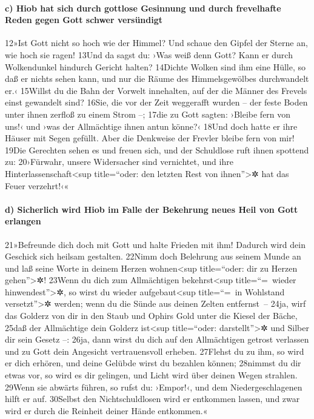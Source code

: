 \hypertarget{c-hiob-hat-sich-durch-gottlose-gesinnung-und-durch-frevelhafte-reden-gegen-gott-schwer-versuxfcndigt}{%
\paragraph{c) Hiob hat sich durch gottlose Gesinnung und durch
frevelhafte Reden gegen Gott schwer
versündigt}\label{c-hiob-hat-sich-durch-gottlose-gesinnung-und-durch-frevelhafte-reden-gegen-gott-schwer-versuxfcndigt}}

12»Ist Gott nicht so hoch wie der Himmel? Und schaue den Gipfel der
Sterne an, wie hoch sie ragen! 13Und da sagst du: ›Was weiß denn Gott?
Kann er durch Wolkendunkel hindurch Gericht halten? 14Dichte Wolken sind
ihm eine Hülle, so daß er nichts sehen kann, und nur die Räume des
Himmelsgewölbes durchwandelt er.‹ 15Willst du die Bahn der Vorwelt
innehalten, auf der die Männer des Frevels einst gewandelt sind? 16Sie,
die vor der Zeit weggerafft wurden -- der feste Boden unter ihnen
zerfloß zu einem Strom --; 17die zu Gott sagten: ›Bleibe fern von uns!‹
und ›was der Allmächtige ihnen antun könne?‹ 18Und doch hatte er ihre
Häuser mit Segen gefüllt. Aber die Denkweise der Frevler bleibe fern von
mir! 19Die Gerechten sehen es und freuen sich, und der Schuldlose ruft
ihnen spottend zu: 20›Fürwahr, unsere Widersacher sind vernichtet, und
ihre Hinterlassenschaft\textless sup title=``oder: den letzten Rest von
ihnen''\textgreater✲ hat das Feuer verzehrt!‹«

\hypertarget{d-sicherlich-wird-hiob-im-falle-der-bekehrung-neues-heil-von-gott-erlangen}{%
\paragraph{d) Sicherlich wird Hiob im Falle der Bekehrung neues Heil von
Gott
erlangen}\label{d-sicherlich-wird-hiob-im-falle-der-bekehrung-neues-heil-von-gott-erlangen}}

21»Befreunde dich doch mit Gott und halte Frieden mit ihm! Dadurch wird
dein Geschick sich heilsam gestalten. 22Nimm doch Belehrung aus seinem
Munde an und laß seine Worte in deinem Herzen wohnen\textless sup
title=``oder: dir zu Herzen gehen''\textgreater✲! 23Wenn du dich zum
Allmächtigen bekehrst\textless sup title=``=~wieder
hinwendest''\textgreater✲, so wirst du wieder aufgebaut\textless sup
title=``=~in Wohlstand versetzt''\textgreater✲ werden; wenn du die Sünde
aus deinen Zelten entfernst~-- 24ja, wirf das Golderz von dir in den
Staub und Ophirs Gold unter die Kiesel der Bäche, 25daß der Allmächtige
dein Golderz ist\textless sup title=``oder: darstellt''\textgreater✲ und
Silber dir sein Gesetz --: 26ja, dann wirst du dich auf den Allmächtigen
getrost verlassen und zu Gott dein Angesicht vertrauensvoll erheben.
27Flehst du zu ihm, so wird er dich erhören, und deine Gelübde wirst du
bezahlen können; 28nimmst du dir etwas vor, so wird es dir gelingen, und
Licht wird über deinen Wegen strahlen. 29Wenn sie abwärts führen, so
rufst du: ›Empor!‹, und dem Niedergeschlagenen hilft er auf. 30Selbst
den Nichtschuldlosen wird er entkommen lassen, und zwar wird er durch
die Reinheit deiner Hände entkommen.«

